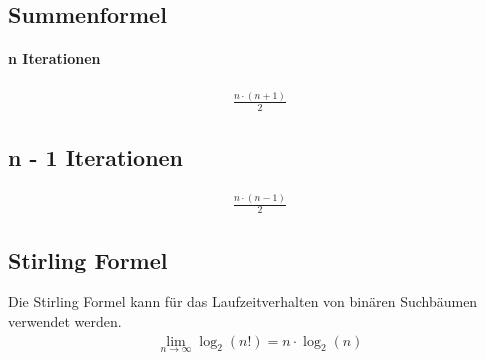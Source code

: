 \subsection{Summenformel}
\paragraph{n Iterationen}
\begin{align}
	\frac{n \cdot (n + 1)}{2}
\end{align}

\subsection{n - 1 Iterationen}
\begin{align}
	\frac{n \cdot (n - 1)}{2}
\end{align}

\subsection{Stirling Formel}
\label{eq:stirling}
Die Stirling Formel kann für das Laufzeitverhalten von binären Suchbäumen verwendet werden.
\begin{align}
	\lim\limits_{n \rightarrow \infty} \log_2(n!) = n\cdot \log_2(n)
\end{align}

